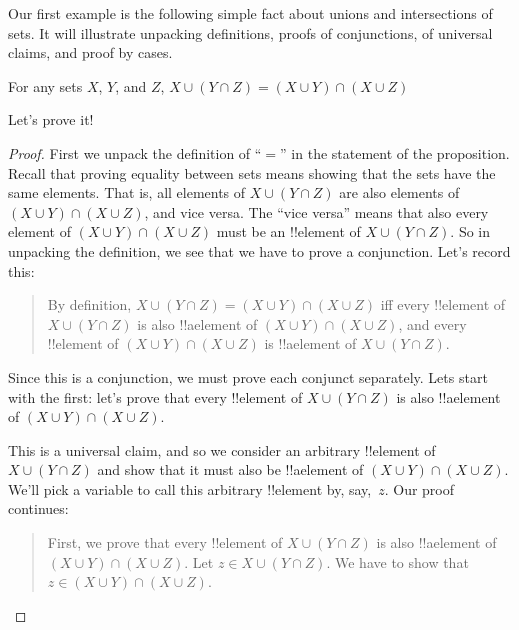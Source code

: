 \documentclass[../../../include/open-logic-section]{subfiles}
\begin{document}


Our first example is the following simple fact about unions and
intersections of sets.  It will illustrate unpacking definitions,
proofs of conjunctions, of universal claims, and proof by cases.

\begin{prop}
For any sets $X$, $Y$, and $Z$, $X \cup (Y \cap Z) = (X \cup Y)
\cap (X \cup Z)$
\end{prop}

Let's prove it!{}

\begin{proof}

First we unpack the definition of ``$=$'' in the statement of the
proposition. Recall that proving equality between sets means showing
that the sets have the same elements. That is, all elements of $X \cup
(Y \cap Z)$ are also elements of $(X \cup Y) \cap (X \cup Z)$, and
vice versa.  The ``vice versa'' means that also every element of $(X
\cup Y) \cap (X \cup Z)$ must be an !!{element} of $X \cup (Y \cap
Z)$.  So in unpacking the definition, we see that we have to prove a
conjunction.  Let's record this:

\begin{quote}
By definition, $X \cup (Y \cap Z) = (X \cup Y) \cap (X \cup Z)$ iff
every !!{element} of $X \cup (Y \cap Z)$ is also !!a{element} of $(X
\cup Y) \cap (X \cup Z)$, and every !!{element} of $(X \cup Y) \cap (X
\cup Z)$ is !!a{element} of $X \cup (Y \cap Z)$.
\end{quote}

Since this is a conjunction, we must prove each conjunct
separately. Lets start with the first: let's prove that every
!!{element} of $X \cup (Y \cap Z)$ is also !!a{element} of $(X
\cup Y) \cap (X \cup Z)$.

This is a universal claim, and so we consider an arbitrary !!{element}
of $X \cup (Y \cap Z)$ and show that it must also be !!a{element} of
$(X \cup Y) \cap (X \cup Z)$. We'll pick a variable to call this
arbitrary !!{element} by, say,~$z$.  Our proof continues:

\begin{quote}
First, we prove that every !!{element} of $X \cup (Y \cap Z)$ is also
!!a{element} of $(X \cup Y) \cap (X \cup Z)$. Let $z \in X \cup (Y
\cap Z)$. We have to show that $z \in (X \cup Y) \cap (X \cup Z)$.
\end{quote}  


\end{proof}
\end{document}
